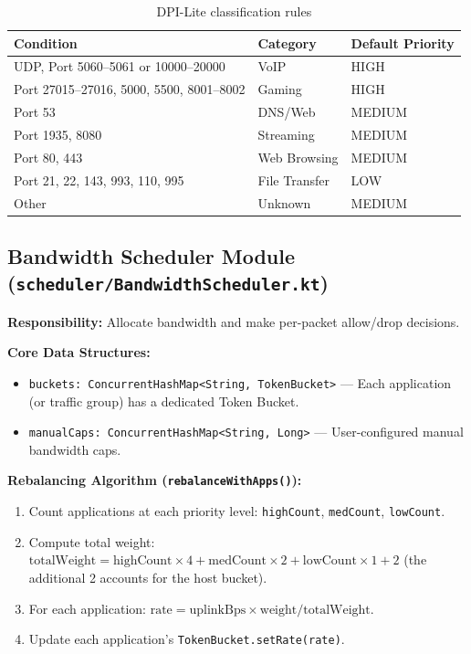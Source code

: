 \begin{table}[H]
\centering
\caption{DPI-Lite classification rules}
\label{tab:dpi_rules}
\begin{tabular}{@{}lll@{}}
\toprule
\textbf{Condition} & \textbf{Category} & \textbf{Default Priority} \\
\midrule
UDP, Port 5060--5061 or 10000--20000 & VoIP            & HIGH \\
Port 27015--27016, 5000, 5500, 8001--8002 & Gaming     & HIGH \\
Port 53                               & DNS/Web         & MEDIUM \\
Port 1935, 8080                        & Streaming       & MEDIUM \\
Port 80, 443                           & Web Browsing    & MEDIUM \\
Port 21, 22, 143, 993, 110, 995       & File Transfer   & LOW \\
Other                                  & Unknown         & MEDIUM \\
\bottomrule
\end{tabular}
\end{table}

\subsection{Bandwidth Scheduler Module (\texttt{scheduler/BandwidthScheduler.kt})}

\textbf{Responsibility:} Allocate bandwidth and make per-packet allow/drop decisions.

\textbf{Core Data Structures:}
\begin{itemize}
    \item \texttt{buckets: ConcurrentHashMap<String, TokenBucket>} --- Each application (or traffic group) has a dedicated Token Bucket.
    \item \texttt{manualCaps: ConcurrentHashMap<String, Long>} --- User-configured manual bandwidth caps.
\end{itemize}

\textbf{Rebalancing Algorithm (\texttt{rebalanceWithApps()}):}
\begin{enumerate}
    \item Count applications at each priority level: \texttt{highCount}, \texttt{medCount}, \texttt{lowCount}.
    \item Compute total weight: $\text{totalWeight} = \text{highCount} \times 4 + \text{medCount} \times 2 + \text{lowCount} \times 1 + 2$ (the additional 2 accounts for the host bucket).
    \item For each application: $\text{rate} = \text{uplinkBps} \times \text{weight} / \text{totalWeight}$.
    \item Update each application's \texttt{TokenBucket.setRate(rate)}.
\end{enumerate}

